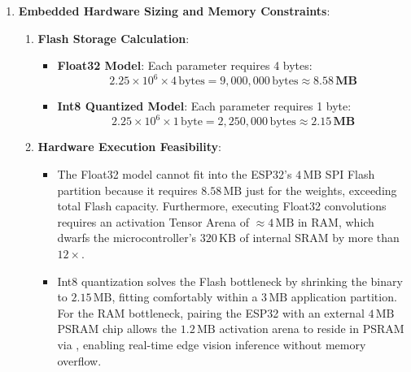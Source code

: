 \begin{enumerate}
    \item \textbf{Embedded Hardware Sizing and Memory Constraints}:
    \begin{enumerate}
        \item \textbf{Flash Storage Calculation}:
        \begin{itemize}
            \item \textbf{Float32 Model}: Each parameter requires 4 bytes:
            \begin{equation*}
            2.25 \times 10^6 \times 4\,\text{bytes} = 9{,}000{,}000\,\text{bytes} \approx \mathbf{8.58\,\text{MB}}
            \end{equation*}
            \item \textbf{Int8 Quantized Model}: Each parameter requires 1 byte:
            \begin{equation*}
            2.25 \times 10^6 \times 1\,\text{byte} = 2{,}250{,}000\,\text{bytes} \approx \mathbf{2.15\,\text{MB}}
            \end{equation*}
        \end{itemize}
        \item \textbf{Hardware Execution Feasibility}:
        \begin{itemize}
            \item The Float32 model cannot fit into the ESP32's $4\,\text{MB}$ SPI Flash partition because it requires $8.58\,\text{MB}$ just for the weights, exceeding total Flash capacity. Furthermore, executing Float32 convolutions requires an activation Tensor Arena of $\approx 4\,\text{MB}$ in RAM, which dwarfs the microcontroller's $320\,\text{KB}$ of internal SRAM by more than $12\times$.
            \item Int8 quantization solves the Flash bottleneck by shrinking the binary to $2.15\,\text{MB}$, fitting comfortably within a $3\,\text{MB}$ application partition. For the RAM bottleneck, pairing the ESP32 with an external $4\,\text{MB}$ PSRAM chip allows the $1.2\,\text{MB}$ activation arena to reside in PSRAM via , enabling real-time edge vision inference without memory overflow.
        \end{itemize}
    \end{enumerate}
\end{enumerate}